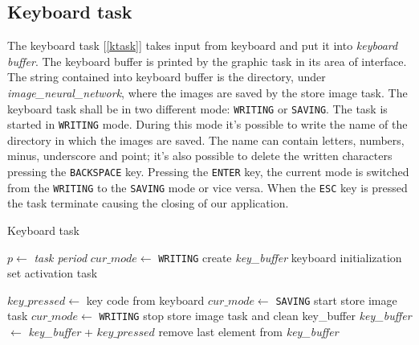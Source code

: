 \documentclass[12pt]{article}
\begin{document}
\subsection{Keyboard task}
The keyboard task [\ref{ktask}] takes input from keyboard and
put it into \textit{keyboard buffer}. The keyboard buffer is printed by the
graphic task in its area of interface. The string contained into keyboard
buffer is the directory, under \textit{image\_neural\_network}, where the
images are saved by the store image task. The keyboard task shall be in two
different mode: \texttt{WRITING} or \texttt{SAVING}. The task is started in
\texttt{WRITING} mode. During this mode it's possible to write the name of
the directory in which the images are saved. The name can contain letters,
numbers, minus, underscore and point; it's also possible to delete the written
characters pressing the \texttt{BACKSPACE} key. Pressing the
\texttt{ENTER} key, the current mode is switched from the \texttt{WRITING} to
the \texttt{SAVING} mode or vice versa. When the \texttt{ESC} key is pressed the
task terminate causing the closing of our application.

\begin{algorithm}[t]
\caption{Keyboard task}
\label{ktask}

\begin{algorithmic}
\State $p\gets$ \textit{task period}
\State $cur\_mode\gets$ \texttt{WRITING}
\State create \textit{key\_buffer}
\State keyboard initialization
\State set activation task

\Repeat
\State $key\_pressed\gets$ key code from keyboard
    \State $cur\_mode\gets$ \texttt{SAVING}
    \State start store image task
    \Else
    \State $cur\_mode\gets$ \texttt{WRITING}
    \State stop store image task and clean key\_buffer
    \EndIf
{}
        \State \textit{key\_buffer} $\gets$ \textit{key\_buffer} + $key\_pressed$ 
        \State remove last element from \textit{key\_buffer}
    \EndIf
\EndIf


\end{algorithmic}
\end{algorithm}
\end{document}
